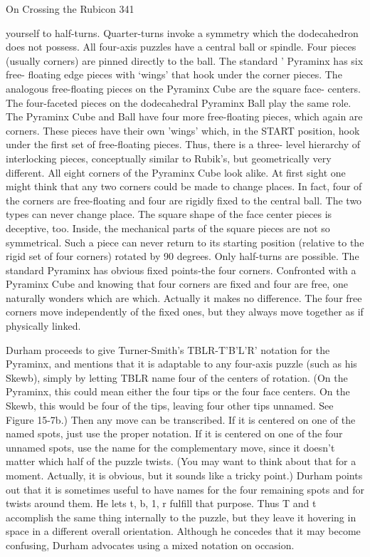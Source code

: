 On Crossing the Rubicon                                                                 341

  yourself to half-turns. Quarter-turns invoke a symmetry which the
  dodecahedron does not possess.
          All four-axis puzzles have a central ball or spindle. Four pieces (usually
  corners) are pinned directly to the ball. The standard ' Pyraminx has six free-
  floating edge pieces with `wings' that hook under the corner pieces. The
  analogous free-floating pieces on the Pyraminx Cube are the square face-
  centers. The four-faceted pieces on the dodecahedral Pyraminx Ball play the
  same role.
          The Pyraminx Cube and Ball have four more free-floating pieces, which
  again are corners. These pieces have their own 'wings' which, in the START
  position, hook under the first set of free-floating pieces. Thus, there is a three-
  level hierarchy of interlocking pieces, conceptually similar to Rubik's, but
  geometrically very different.
          All eight corners of the Pyraminx Cube look alike. At first sight one
  might think that any two corners could be made to change places. In fact, four
  of the corners are free-floating and four are rigidly fixed to the central ball. The
  two types can never change place. The square shape of the face center pieces is
  deceptive, too. Inside, the mechanical parts of the square pieces are not so
  symmetrical. Such a piece can never return to its starting position (relative to
  the rigid set of four corners) rotated by 90 degrees. Only half-turns are possible.
          The standard Pyraminx has obvious fixed points-the four corners.
  Confronted with a Pyraminx Cube and knowing that four corners are fixed and
  four are free, one naturally wonders which are which. Actually it makes no
  difference. The four free corners move independently of the fixed ones, but they
  always move together as if physically linked.

        Durham proceeds to give Turner-Smith's TBLR-T'B'L'R' notation for the
Pyraminx, and mentions that it is adaptable to any four-axis puzzle (such as his
Skewb), simply by letting TBLR name four of the centers of rotation. (On the
Pyraminx, this could mean either the four tips or the four face centers. On the Skewb,
this would be four of the tips, leaving four other tips unnamed. See Figure 15-7b.)
Then any move can be transcribed. If it is centered on one of the named spots, just use
the proper notation. If it is centered on one of the four unnamed spots, use the name
for the complementary move, since it doesn't matter which half of the puzzle twists.
(You may want to think about that for a moment. Actually, it is obvious, but it sounds
like a tricky point.) Durham points out that it is sometimes useful to have names for
the four remaining spots and for twists around them. He lets t, b, 1, r fulfill that
purpose. Thus T and t accomplish the same thing internally to the puzzle, but they
leave it hovering in space in a different overall orientation. Although he concedes that
it may become confusing, Durham advocates using a mixed notation on occasion.


